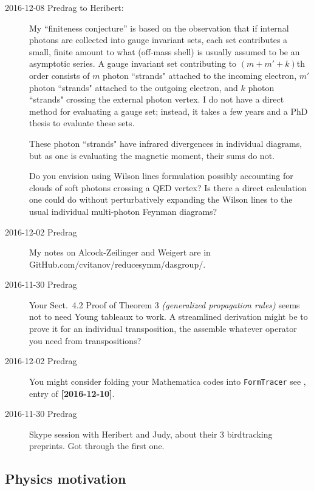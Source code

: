 \begin{description}
  \item[2016-12-08 Predrag to Heribert:]
My
{``finiteness conjecture''} is based on the observation that if internal
photons are collected into gauge invariant sets, each set contributes a
small, finite amount to what (off-mass shell) is usually assumed to be an
asymptotic series.
A gauge invariant set contributing to $(m+m'+k)$th order consists of $m$
photon ``strands" attached to the incoming electron, $m'$ photon ``strands"
attached to the outgoing electron, and $k$ photon ``strands" crossing the
external photon vertex. I do not have a direct method for evaluating a gauge
set; instead, it takes a few years and a PhD thesis to evaluate these sets.

These photon ``strands" have infrared divergences in individual diagrams,
but as one is evaluating the magnetic moment, their sums do not.

Do you envision using Wilson lines formulation possibly accounting for clouds
of soft photons crossing a QED vertex? Is there a direct calculation one
could do without perturbatively expanding the Wilson lines to the usual
individual multi-photon Feynman diagrams?

  \item[2016-12-02 Predrag]
My notes  on Alcock-Zeilinger and Weigert are in\\
{GitHub.com/cvitanov/reducesymm/dasgroup/}.

  \item[2016-11-30 Predrag]
Your Sect.~4.2 Proof of Theorem 3 \emph{(generalized propagation rules)}
seems not to need Young tableaux to work. A streamlined derivation might be
to prove it for an individual transposition, the assemble whatever operator
you need from transpositions?

  \item[2016-12-02 Predrag]
You might consider folding your Mathematica codes into
\texttt{FormTracer} see , entry of {\bf
[2016-12-10]}.

  \item[2016-11-30 Predrag]
Skype session with Heribert and Judy, about their 3 birdtracking preprints.
Got through the first one.

\end{description}

\subsection{Physics motivation}
\label{s-AlcZei16-HEP}

